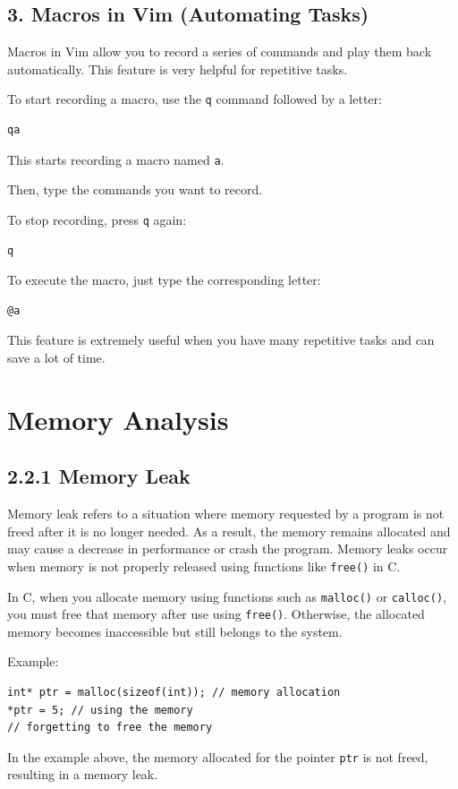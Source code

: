 \documentclass{article}
\begin{document}
\subsection*{3. Macros in Vim (Automating Tasks)}
Macros in Vim allow you to record a series of commands and play them back automatically. This feature is very helpful for repetitive tasks.

To start recording a macro, use the \texttt{q} command followed by a letter:
\begin{verbatim}
qa
\end{verbatim}
This starts recording a macro named \texttt{a}.

Then, type the commands you want to record.

To stop recording, press \texttt{q} again:
\begin{verbatim}
q
\end{verbatim}

To execute the macro, just type the corresponding letter:
\begin{verbatim}
@a
\end{verbatim}

This feature is extremely useful when you have many repetitive tasks and can save a lot of time.










\section*{Memory Analysis}

\subsection*{2.2.1 Memory Leak}
Memory leak refers to a situation where memory requested by a program is not freed after it is no longer needed. As a result, the memory remains allocated and may cause a decrease in performance or crash the program. Memory leaks occur when memory is not properly released using functions like \texttt{free()} in C.

In C, when you allocate memory using functions such as \texttt{malloc()} or \texttt{calloc()}, you must free that memory after use using \texttt{free()}. Otherwise, the allocated memory becomes inaccessible but still belongs to the system.

Example:
\begin{verbatim}
int* ptr = malloc(sizeof(int)); // memory allocation
*ptr = 5; // using the memory
// forgetting to free the memory
\end{verbatim}
In the example above, the memory allocated for the pointer \texttt{ptr} is not freed, resulting in a memory leak.
\end{document}
